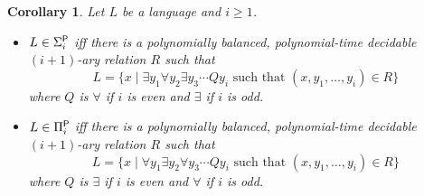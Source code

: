 \documentclass [11pt]{article}
\newcommand{\ccfont}[1]{\protect\mathsf{#1}}
\newcommand{\Ptime}{\ccfont{P}}
\newcommand{\phs}[1]{\Sigma_{#1}^{\Ptime}}
\newcommand{\php}[1]{\Pi_{#1}^{\Ptime}}
\newtheorem{corollary}[theorem]{Corollary}
\begin{document}
\begin{corollary}
\label{cor:main}
Let $L$ be a language and $i \geq 1$. 
\begin{itemize}
\item  $L \in \phs{i}$ iff there is
a polynomially balanced, polynomial-time decidable $(i+1)$-ary
relation $R$ such that 
\[
L = \{x \mid \exists y_1 \forall y_2\exists y_3\cdots Q y_i \mbox{ such
that } 
(x,y_1,\ldots,y_i) \in R\}
\]
where $Q$ is $\forall$ if $i$ is even and $\exists$ if $i$ is odd. 
\item $L \in \php{i}$ iff there is
a polynomially balanced, polynomial-time decidable $(i+1)$-ary
relation $R$ such that 
\[
L = \{x \mid \forall y_1 \exists y_2\forall y_3\cdots Q y_i \mbox{ such
that } 
(x,y_1,\ldots,y_i) \in R\}
\]
where $Q$ is $\exists$ if $i$ is even and $\forall$ if $i$ is odd. 
\end{itemize}

\end{corollary}
\end{document}
